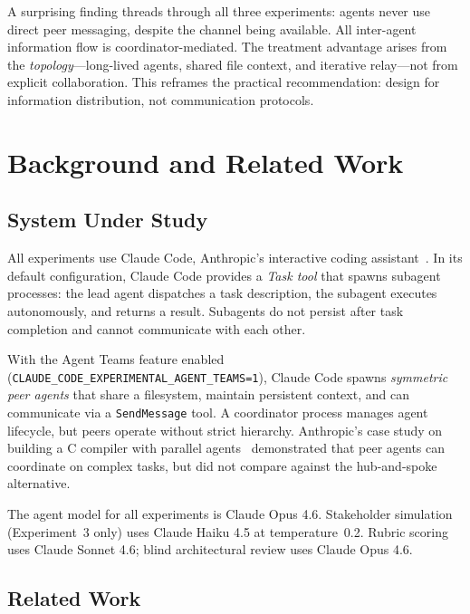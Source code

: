 \documentclass[11pt,letterpaper]{article}
\begin{document}
A surprising finding threads through all three experiments: agents never
use direct peer messaging, despite the channel being available. All
inter-agent information flow is coordinator-mediated. The treatment
advantage arises from the \emph{topology}---long-lived agents, shared
file context, and iterative relay---not from explicit collaboration.
This reframes the practical recommendation: design for information
distribution, not communication protocols.


\section{Background and Related Work}
\label{sec:background}

\subsection{System Under Study}

All experiments use Claude Code, Anthropic's interactive coding
assistant~\cite{anthropic2026agentteams}. In its default configuration,
Claude Code provides a \emph{Task tool} that spawns subagent processes:
the lead agent dispatches a task description, the subagent executes
autonomously, and returns a result. Subagents do not persist after task
completion and cannot communicate with each other.

With the Agent Teams feature enabled
(\texttt{CLAUDE\_CODE\_EXPERIMENTAL\_AGENT\_TEAMS=1}), Claude Code spawns
\emph{symmetric peer agents} that share a filesystem, maintain persistent
context, and can communicate via a \texttt{SendMessage} tool. A
coordinator process manages agent lifecycle, but peers operate without
strict hierarchy. Anthropic's case study on building a C compiler with
parallel agents~\cite{anthropic2026ccompiler} demonstrated that peer agents
can coordinate on complex tasks, but did not compare against the
hub-and-spoke alternative.

The agent model for all experiments is Claude Opus 4.6. Stakeholder
simulation (Experiment~3 only) uses Claude Haiku 4.5 at temperature~0.2.
Rubric scoring uses Claude Sonnet 4.6; blind architectural review uses
Claude Opus 4.6.

\subsection{Related Work}
\end{document}
